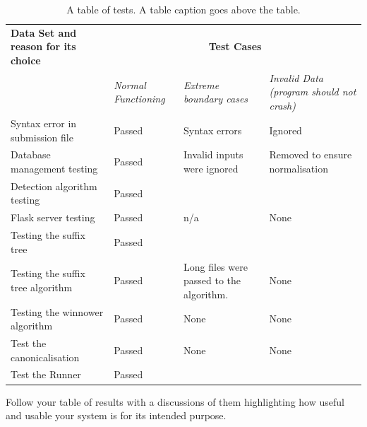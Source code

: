 \documentclass[11pt,a4paper]{article}
\begin{document}
\begin{table}[h!]
  \centering
\caption{A table of tests. A table caption goes above the table.}

  \begin{tabular}[t]{|p{5cm}|p{3cm}|p{3cm}|p{3cm}|} 
      \hline 
          \textbf{Data Set and reason for its choice} & 
          \multicolumn{3}{c|}{\textbf{Test Cases}}
          \\
          \cline{2-4} & 
            \emph{Normal Functioning} & 
            \emph{Extreme boundary cases} &
            \emph{Invalid Data (program should not crash)} 
          \\ 
          \hline 
            Syntax error in submission file & 
            Passed & 
            Syntax errors & 
            Ignored
          \\
          \hline 
            Database management testing &
            Passed &
            Invalid inputs were ignored &
            Removed to ensure normalisation
          \\ 
          \hline
            Detection algorithm testing &
            Passed &
            &
          \\ 
          \hline
            Flask server testing &
            Passed &
            n/a &
            None
          \\
          \hline
              Testing the suffix tree &
              Passed &
              &
          \\
          \hline
            Testing the suffix tree algorithm &
            Passed &
            Long files were passed to the algorithm. &
            None
          \\
          \hline
            Testing the winnower algorithm &
            Passed &
            None &
            None
          \\
          \hline
            Test the canonicalisation &
            Passed &
            None &
            None
          \\
          \hline
          Test the Runner &
          Passed &
          &
          \\
          \hline
  \end{tabular}

\label{tab:tests}
\end{table}

Follow your table of results with a discussions of them highlighting
how useful and usable your system is for its intended purpose.
\end{document}
